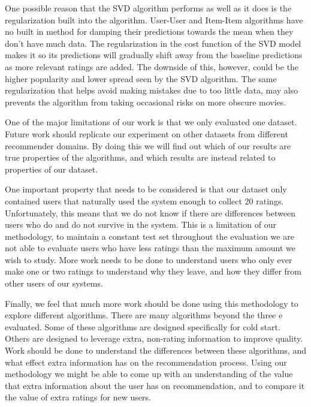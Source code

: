 \documentclass[letterpaper]{sig-alternate}
\begin{document}
  One possible reason that the SVD algorithm performs as well as it does is the regularization built into the algorithm.
  User-User and Item-Item algorithms have no built in method for damping their predictions towards the mean when they don't have much data.
  The regularization in the cost function of the SVD model makes it so its predictions will gradually shift away from the baseline predictions as more relevant ratings are added.
  The downside of this, however, could be the higher popularity and lower spread seen by the SVD algorithm.
  The same regularization that helps avoid making mistakes due to too little data, may also prevents the algorithm from taking occasional risks on more obscure movies.
  


  One of the major limitations of our work is that we only evaluated one dataset.
  Future work should replicate our experiment on other datasets from different recommender domains.
  By doing this we will find out which of our results are true properties of the algorithms, and which results are instead related to properties of our dataset.

  One important property that needs to be considered is that our dataset only contained users that naturally used the system enough to collect 20 ratings.
  Unfortunately, this means that we do not know if there are differences between users who do and do not survive in the system.
  This is a limitation of our methodology, to maintain a constant test set throughout the evaluation we are not able to evaluate users who have less ratings than the maximum amount we wish to study.
  More work needs to be done to understand users who only ever make one or two ratings to understand why they leave, and how they differ from other users of our systems.

  Finally, we feel that much more work should be done using this methodology to explore different algorithms.
  There are many algorithms beyond the three e evaluated.
  Some of these algorithms are designed specifically for cold start.
  Others are designed to leverage extra, non-rating information to improve quality.
  Work should be done to understand the differences between these algorithms, and what effect extra information has on the recommendation process.
  Using our methodology we might be able to come up with an understanding of the value that extra information about the user has on recommendation, and to compare it the value of extra ratings for new users.
\end{document}
